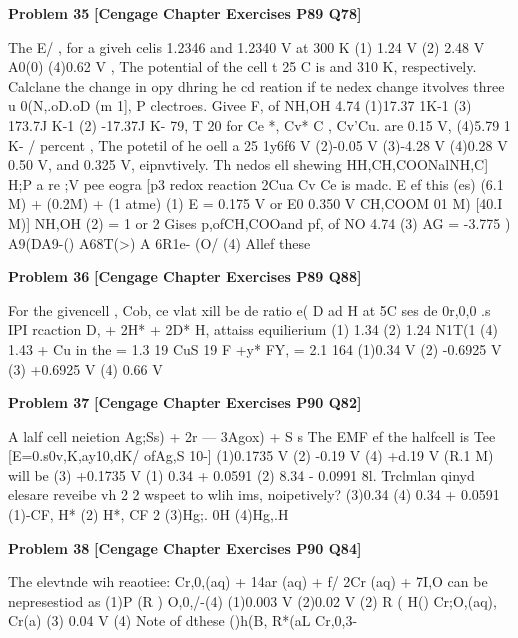 \begin{problembox}
\textbf{Problem 35} \hfill \textbf{[Cengage Chapter Exercises P89 Q78]}
\label{q:ext-cng-th-35}

The E/ , for a giveh celis 1.2346 and 1.2340 V at 300 K
(1) 1.24 V
(2) 2.48 V
A0(0)
(4)0.62 V
, The potential of the cell t 25  C is
and 310 K, respectively. Calclane the change in opy
dhring he cd reation if te nedex change itvolves three
u 0(N,.oD.oD (m 1],
P
clectroes.
Givee F, of NH,OH  4.74
(1)17.37 1K-1
(3) 173.7J K-1
(2) -17.37J K-
79, T 20 for Ce *, Cv* C , Cv'Cu. are 0.15 V,
(4)5.79 1 K-
/ percent , The potetil of he oell a 25 
1y6f6 V
(2)-0.05 V (3)-4.28 V
 (4)0.28 V
0.50 V, and 0.325 V, eipnvtively. Th nedos ell shewing
HH,CH,COONalNH,C]
H;P
a re ;V pee eogra [p3
redox reaction 2Cua
  Cv  Ce is madc. E  ef this
(es)
(6.1 M)
+
(0.2M)
+
(1 atme)
(1) E  = 0.175 V or E0  0.350 V
CH,COOM
01 M)
[40.I M)]
NH,OH
(2) = 1 or 2
Gises p,ofCH,COOand pf, of NO  4.74
(3) AG  = -3.775 )
A9(DA9-()
A68T(>) A 6R1e- (O/
(4) Allef these
\end{problembox}

\begin{problembox}
\textbf{Problem 36} \hfill \textbf{[Cengage Chapter Exercises P89 Q88]}
\label{q:ext-cng-th-36}

For the givencell ,
Cob, ce
vlat xill be de ratio e( D  ad H  at 5C ses de
0r,0,0 .s 
IPI
rcaction D, + 2H*
+ 2D*  H, attaiss equilierium
(1) 1.34
(2) 1.24
N1T(1
(4) 1.43
+ Cu in the
 = 1.3   19
CuS  19 
F +y*  FY,
 = 2.1   164
(1)0.34 V
(2) -0.6925 V
(3) +0.6925 V
(4) 0.66 V
\end{problembox}

\begin{problembox}
\textbf{Problem 37} \hfill \textbf{[Cengage Chapter Exercises P90 Q82]}
\label{q:ext-cng-th-37}

A lalf cell neietion Ag;Ss) + 2r ---  3Agox) + S  s
The EMF ef the halfcell is
Tee
[E=0.s0v,K,ay10,dK/ ofAg,S 10-]
(1)0.1735 V
(2) -0.19 V
(4) +d.19 V
(R.1 M) will be
(3) +0.1735 V
(1) 0.34 + 
0.0591
(2) 8.34 -
0.0991
8l. Trclmlan qinyd elesare reveibe vh
2
2
wspeet to wlih ims, noipetively?
(3)0.34
(4) 0.34 +
0.0591
(1)-CF, H*
(2) H*, CF
2
(3)Hg;. 0H
(4)Hg,.H
\end{problembox}

\begin{problembox}
\textbf{Problem 38} \hfill \textbf{[Cengage Chapter Exercises P90 Q84]}
\label{q:ext-cng-th-38}

The elevtnde wih reaotiee: Cr,0,(aq) + 14ar (aq)
+ f/   2Cr (aq) + 7I,O can be nepresestiod as
(1)P (R ) O,0,/-(4)
(1)0.003 V
(2)0.02 V
(2) R ( H() Cr;O,(aq), Cr(a)
(3) 0.04 V
(4) Note of dthese
()h(B, R*(aL Cr,0,3-
\end{problembox}

